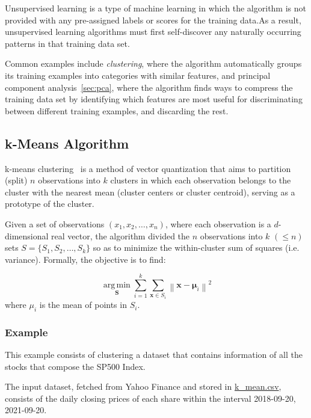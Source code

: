 Unsupervised learning is a type of machine learning in which the algorithm is not provided with any pre-assigned labels or scores for the training data.As a result, unsupervised learning algorithms must first self-discover any naturally occurring patterns in that training data set. 
    
Common examples include \emph{clustering}, where the algorithm automatically groups its training examples into categories with similar features, and principal component analysis~\ref{sec:pca}, where the algorithm finds ways to compress the training data set by identifying which features are most useful for discriminating between different training examples, and discarding the rest. 
    
\subsection{k-Means Algorithm}
    
k-means clustering~\cite{bib:k-means} is a method of vector quantization that aims to partition (split) $n$ observations into $k$ clusters in which each observation belongs to the cluster with the nearest mean (cluster centers or cluster centroid), serving as a prototype of the cluster. 
    
Given a set of observations $(x_1, x_2, \ldots, x_n)$, where each observation is a $d$-dimensional real vector, the algorithm divided the $n$ observations into $k$ $(\leq n)$ sets $S = \{S_1, S_2, \ldots, S_k\}$ so as to minimize the within-cluster sum of squares (i.e. variance). Formally, the objective is to find:
    
\begin{equation}
\underset {\mathbf {S}}{\operatorname {arg\,min} } \sum _{i=1}^{k}\sum _{\mathbf {x} \in S_{i}}\left\|\mathbf {x} -{\boldsymbol {\mu }}_{i}\right\|^{2}
\end{equation}
where $μ_i$ is the mean of points in $S_i$. 
    
\subsubsection{Example}
This example consists of clustering a dataset that contains information of all the stocks that compose the SP500 Index. 
    
The input dataset, fetched from Yahoo Finance and stored in \href{https://github.com/matteosan1/finance_course/raw/develop/libro/input_files/k\_mean.csv}{k\_mean.csv}, consists of the daily closing prices of each share within the interval 2018-09-20, 2021-09-20.
    
